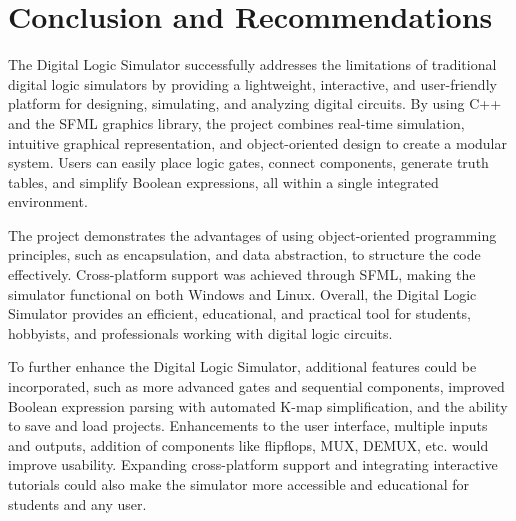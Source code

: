 \section{Conclusion and Recommendations}

The Digital Logic Simulator successfully addresses the limitations of traditional digital logic simulators by providing a lightweight, interactive, and user-friendly platform for designing, simulating, and analyzing digital circuits. By using C++ and the SFML graphics library, the project combines real-time simulation, intuitive graphical representation, and object-oriented design to create a modular system. Users can easily place logic gates, connect components, generate truth tables, and simplify Boolean expressions, all within a single integrated environment.

\vspace{0.5cm}
The project demonstrates the advantages of using object-oriented programming principles, such as encapsulation, and data abstraction, to structure the code effectively. Cross-platform support was achieved through SFML, making the simulator functional on both Windows and Linux. Overall, the Digital Logic Simulator provides an efficient, educational, and practical tool for students, hobbyists, and professionals working with digital logic circuits.

\vspace{0.5cm}
To further enhance the Digital Logic Simulator, additional features could be incorporated, such as more advanced gates and sequential components, improved Boolean expression parsing with automated K-map simplification, and the ability to save and load projects. Enhancements to the user interface, multiple inputs and outputs, addition of components like flipflops, MUX, DEMUX, etc. would improve usability. Expanding cross-platform support and integrating interactive tutorials could also make the simulator more accessible and educational for students and any user.
\clearpage